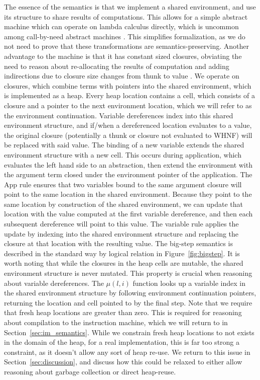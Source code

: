 The essence of the \ce semantics is that we implement a shared
environment, and use its structure to share results of computations. This allows
for a simple abstract machine which can operate on lambda calculus directly,
which is uncommon among call-by-need abstract machines
\cite{jonesstg,launchburynatural,TIM,johnsson1984efficient}. This simplifies
formalization, as we do not need to prove that these transformations are
semantics-preserving. Another advantage to the \ce machine is that it
has constant sized closures, obviating the need to reason about re-allocating
the results of computation and adding indirections due to closure size changes
from thunk to value \cite{jonesstg}. We operate on closures, which combine terms with
pointers into the shared environment, which is implemented as a heap. Every heap
location contains a cell, which consists of a closure and a pointer to the next
environment location, which we will refer to as the environment continuation.
Variable dereferences index into this shared environment structure, and if/when
a dereferenced location evaluates to a value, the original closure (potentially
a thunk or closure not evaluated to WHNF) will be replaced with said value. The
binding of a new variable extends the shared environment structure with a new
cell. This occurs during application, which evaluates the left hand side to an
abstraction, then extend the environment with the argument term closed under the
environment pointer of the application. The App rule ensures that two
variables bound to the same argument closure will point to the same location in
the shared environment. Because they point to the same location by construction
of the shared environment, we can update that location with the value computed
at the first variable dereference, and then each subsequent dereference will
point to this value. The variable rule applies the update by indexing into the
shared environment structure and replacing the closure at that location with the
resulting value. The big-step semantics is described in the standard way by
logical relation in Figure~\ref{fig:bigstep}. It is worth noting that while the
closures in the heap cells are mutable, the shared environment structure is
never mutated. This property is crucial when reasoning about variable
dereferences. The $\mu\left(l, i\right)$ function looks up a variable index in
the shared environment structure by following environment continuation pointers,
returning the location and cell pointed to by the final step. Note that we
require that fresh heap locations are greater than zero. This is required for
reasoning about compilation to the instruction machine, which we will return to
in Section~\ref{sec:im_semantics}. While we constrain fresh heap locations to
not exists in the domain of the heap, for a real implementation, this is far too
strong a constraint, as it doesn't allow any sort of heap re-use. We return to
this issue in Section~\ref{sec:discussion}, and discuss how this could be
relaxed to either allow reasoning about garbage collection or direct heap-reuse.

